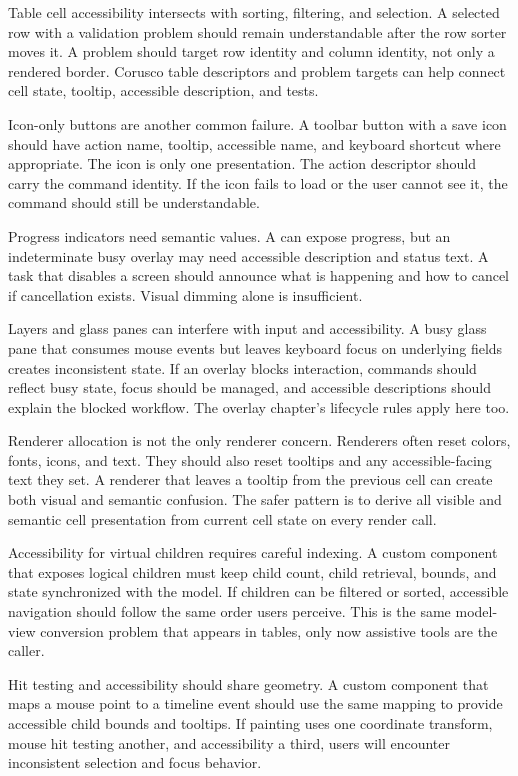 Table cell accessibility intersects with sorting, filtering, and selection. A selected row with a validation problem should remain understandable after the row sorter moves it. A problem should target row identity and column identity, not only a rendered border. Corusco table descriptors and problem targets can help connect cell state, tooltip, accessible description, and tests.

Icon-only buttons are another common failure. A toolbar button with a save icon should have action name, tooltip, accessible name, and keyboard shortcut where appropriate. The icon is only one presentation. The action descriptor should carry the command identity. If the icon fails to load or the user cannot see it, the command should still be understandable.

Progress indicators need semantic values. A  can expose progress, but an indeterminate busy overlay may need accessible description and status text. A task that disables a screen should announce what is happening and how to cancel if cancellation exists. Visual dimming alone is insufficient.

Layers and glass panes can interfere with input and accessibility. A busy glass pane that consumes mouse events but leaves keyboard focus on underlying fields creates inconsistent state. If an overlay blocks interaction, commands should reflect busy state, focus should be managed, and accessible descriptions should explain the blocked workflow. The overlay chapter's lifecycle rules apply here too.

Renderer allocation is not the only renderer concern. Renderers often reset colors, fonts, icons, and text. They should also reset tooltips and any accessible-facing text they set. A renderer that leaves a tooltip from the previous cell can create both visual and semantic confusion. The safer pattern is to derive all visible and semantic cell presentation from current cell state on every render call.

Accessibility for virtual children requires careful indexing. A custom component that exposes logical children must keep child count, child retrieval, bounds, and state synchronized with the model. If children can be filtered or sorted, accessible navigation should follow the same order users perceive. This is the same model-view conversion problem that appears in tables, only now assistive tools are the caller.

Hit testing and accessibility should share geometry. A custom component that maps a mouse point to a timeline event should use the same mapping to provide accessible child bounds and tooltips. If painting uses one coordinate transform, mouse hit testing another, and accessibility a third, users will encounter inconsistent selection and focus behavior.

